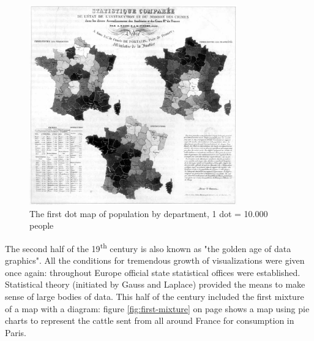 \begin{figure}[h]
\centering
\includegraphics[width=0.8\textwidth,keepaspectratio]{images/history/second-choropleth.jpg}
\caption[
    The first dot map of population by department, 1 dot = 10.000 people, Urldate: 07.2016 \newline
\small\texttt{\url{http://datavis.ca/milestones//admin/uploads/images/montizon-dotmap.jpg}}
]{The first dot map of population by department, 1 dot = 10.000 people}
\label{fig:first-dotmap}
\end{figure}

The second half of the 19\textsuperscript{th} century is also known as "the golden age of data graphics". All the conditions for tremendous growth of visualizations were given once again: throughout Europe official state statistical offices were established.
Statistical theory (initiated by Gauss and Laplace) provided the means to make sense of large bodies of data.
This half of the century included the first mixture of a map with a diagram: figure \ref{fig:first-mixture} on page \pageref{fig:first-mixture} shows a map using pie charts to represent the cattle sent from all around France for consumption in Paris.

